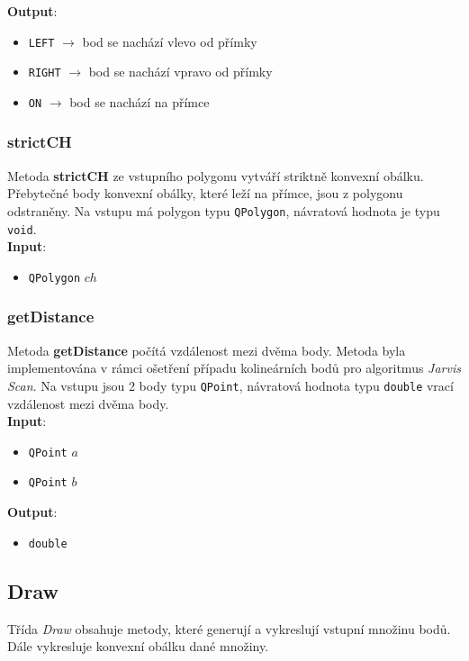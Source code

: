 \documentclass[a4paper, 12pt]{article}
\begin{document}
\textbf{Output}:
\begin{itemize}
\item \texttt{LEFT} $\rightarrow$ bod se nachází vlevo od přímky
\item \texttt{RIGHT} $\rightarrow$ bod se nachází vpravo od přímky
\item \texttt{ON} $\rightarrow$ bod se nachází na přímce
\end{itemize}

\subsubsection*{strictCH}
Metoda \textbf{strictCH} ze vstupního polygonu vytváří striktně konvexní obálku. Přebytečné body konvexní obálky, které leží na přímce, jsou z polygonu odstraněny. Na vstupu má polygon typu \texttt{QPolygon}, návratová hodnota je typu \texttt{void}.\\ 

\textbf{Input}:
\begin{itemize}
\item \texttt{QPolygon} $ch$ 
\end{itemize}

\subsubsection*{getDistance}
Metoda \textbf{getDistance} počítá vzdálenost mezi dvěma body. Metoda byla implementována v rámci ošetření případu kolineárních bodů pro algoritmus \textit{Jarvis Scan}. Na vstupu jsou 2 body typu \texttt{QPoint}, návratová hodnota typu \texttt{double} vrací vzdálenost mezi dvěma body.\\ 

\textbf{Input}:
\begin{itemize}
\item \texttt{QPoint} $a$ 
\item \texttt{QPoint} $b$
\end{itemize}

\textbf{Output}:
\begin{itemize}
\item \texttt{double} 
\end{itemize}

\subsection{Draw}
Třída \textit{Draw} obsahuje metody, které generují a vykreslují vstupní množinu bodů. Dále vykresluje konvexní obálku dané množiny. 
\end{document}
